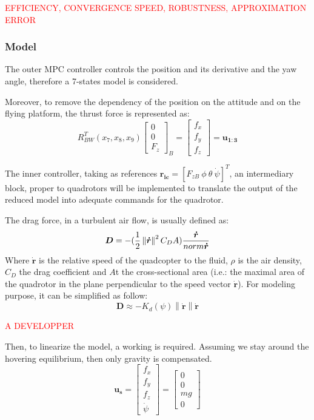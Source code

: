 \documentclass[a4paper, 12pt]{report}
\newcommand\norm[1]{\left\lVert#1\right\rVert}
\begin{document}
\textcolor{red}{EFFICIENCY, CONVERGENCE SPEED, ROBUSTNESS, APPROXIMATION ERROR}



\subsubsection{Model}
The outer MPC controller controls the position and its derivative and the yaw angle, therefore a 7-states model is considered. 

Moreover, to remove the dependency of the position on the attitude and on the flying platform, the thrust force is represented as:
\[ R_{BW}^T(x_7, x_8, x_9) \begin{bmatrix}  0\\ 0\\ F_z \end{bmatrix}_B = \begin{bmatrix}  f_x\\ f_y\\ f_z \end{bmatrix} = \boldsymbol{u_{1:3}}\]

The inner controller, taking as references $\boldsymbol{r_{ic}} = [F_{zB} \ \phi \  \theta \ \dot \psi]^T$, an intermediary block, proper to quadrotors will be implemented to translate the output of the reduced model into adequate commands for the quadrotor.

The drag force, in a turbulent air flow, is usually defined as:
\[ \boldsymbol{D} = -(\frac{1}{2} \norm{\boldsymbol{\dot r}}^2 C_D A) \frac{\boldsymbol{\dot r}}{\\norm{\boldsymbol{\dot r}}}\]
Where $\boldsymbol{\dot r}$ is the relative speed of the quadcopter to the fluid, $\rho$ is the air density, $C_D$  the drag coefficient and $A$t the cross-sectional area (i.e.: the maximal area of the quadrotor in the plane perpendicular to the speed vector $\boldsymbol{\dot r}$). For modeling purpose, it can be simplified as follow:
\[ \boldsymbol{D} \approx -K_d(\psi) \norm{\boldsymbol{\dot r}} \boldsymbol{\dot r}\]

\textcolor{red}{A DEVELOPPER}

Then, to linearize the model, a working is required. Assuming we stay around the hovering equilibrium, then only gravity is compensated.
\[ \boldsymbol{u_s} = \begin{bmatrix} f_x \\ f_y \\ f_z \\ \dot \psi \end{bmatrix} = \begin{bmatrix}  0\\ 0\\ mg \\ 0\end{bmatrix} \]
\end{document}
